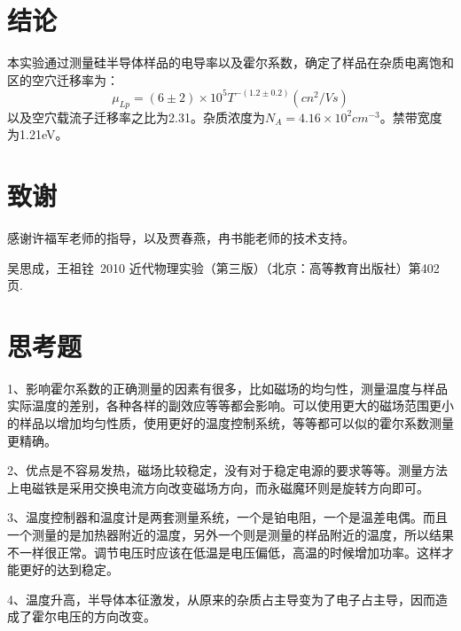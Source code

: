 \documentclass[aps,pre,12pt,preprint,onecolumn,showpacs,showkeys,UTF8]{revtex4-1}
\begin{document}
\section{结论}
本实验通过测量硅半导体样品的电导率以及霍尔系数，确定了样品在杂质电离饱和区的空穴迁移率为：
\begin{equation}
	\mu_{Lp}=(6\pm2)\times 10^5T^{-(1.2\pm0.2)}(cn^2/Vs)
\end{equation}
以及空穴载流子迁移率之比为2.31。杂质浓度为$N_A=4.16\times10^2cm^{-3}$。禁带宽度为1.21eV。
\section{致谢} 
感谢许福军老师的指导，以及贾春燕，冉书能老师的技术支持。

\begin{thebibliography}{}
	 吴思成，王祖铨~2010 近代物理实验（第三版）（北京：高等教育出版社）第402页.%
%
\end{thebibliography}

\clearpage
\appendix
\section{思考题}
1、影响霍尔系数的正确测量的因素有很多，比如磁场的均匀性，测量温度与样品实际温度的差别，各种各样的副效应等等都会影响。可以使用更大的磁场范围更小的样品以增加均匀性质，使用更好的温度控制系统，等等都可以似的霍尔系数测量更精确。

2、优点是不容易发热，磁场比较稳定，没有对于稳定电源的要求等等。测量方法上电磁铁是采用交换电流方向改变磁场方向，而永磁魔环则是旋转方向即可。

3、温度控制器和温度计是两套测量系统，一个是铂电阻，一个是温差电偶。而且一个测量的是加热器附近的温度，另外一个则是测量的样品附近的温度，所以结果不一样很正常。调节电压时应该在低温是电压偏低，高温的时候增加功率。这样才能更好的达到稳定。

4、温度升高，半导体本征激发，从原来的杂质占主导变为了电子占主导，因而造成了霍尔电压的方向改变。
\end{document}
